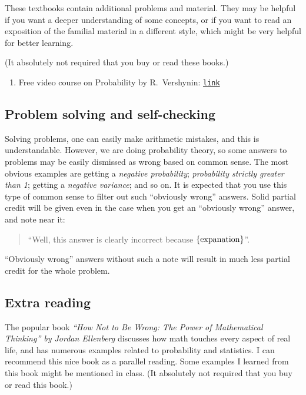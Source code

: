 \documentclass[oneside,11pt]{amsart}
\begin{document}
These textbooks contain additional problems and material.
They may be helpful if you want a deeper understanding of
some concepts, or if you want to read an exposition of the
familial material in a different style, which might be very
helpful for better learning.

(It absolutely not required that you buy or read these books.)

\begin{enumerate}[$\bullet$]
	\item Free video course on Probability by R.~Vershynin:
	\href{https://www.math.uci.edu/~rvershyn/teaching/ugp/ugp.html}{\texttt{link}}
\end{enumerate}

\subsection{Problem solving and self-checking}
\label{sub:problem_solving}

Solving problems, one can easily make arithmetic mistakes,
and this is understandable. However, 
we are doing probability theory, so some answers to problems
may be easily dismissed as wrong
based on common sense. 
The most obvious examples are 
getting a \emph{negative probability}; \emph{probability strictly greater than 1};
getting a \emph{negative variance}; and so on.
It is expected that you use this type of common sense to filter out 
such ``obviously wrong'' answers.
Solid partial credit will be given even in the case when you get an ``obviously
wrong'' answer, and note near it:
\begin{quote}
	``Well, this answer is clearly incorrect because $\{\textnormal{expanation}\}$''.
\end{quote}
``Obviously wrong'' answers without such a note 
will result in much less partial credit for the whole problem.

\subsection{Extra reading}

The popular book
\emph{``How Not to Be Wrong: The Power of Mathematical Thinking'' by Jordan Ellenberg}
discusses how math touches every aspect of real life, and has 
numerous examples related to probability and statistics. 
I can recommend this nice book as a parallel reading. Some
examples I learned from this book might be mentioned in class.
(It absolutely not required that you buy or read this book.)
\end{document}
